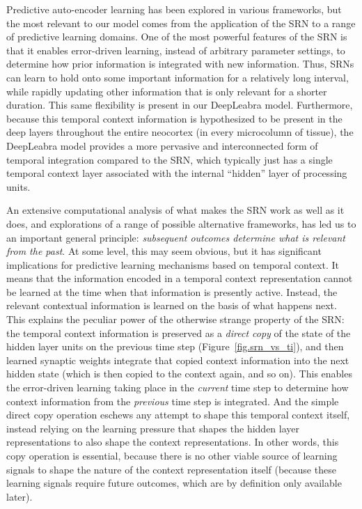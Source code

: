 \documentclass[12pt,twoside]{naturefigs}
\newif\myifpdf
\begin{document}

Predictive auto-encoder learning has been explored in various frameworks, but the most relevant to our model comes from the application of the SRN to a range of predictive learning domains\cite{Elman90,ElmanBatesKarmiloff-SmithEtAl96}.  One of the most powerful features of the SRN is that it enables error-driven learning, instead of arbitrary parameter settings, to determine how prior information is integrated with new information.  Thus, SRNs can learn to hold onto some important information for a relatively long interval, while rapidly updating other information that is only relevant for a shorter duration.  This same flexibility is present in our DeepLeabra model.  Furthermore, because this temporal context information is hypothesized to be present in the deep layers throughout the entire neocortex (in every microcolumn of tissue), the DeepLeabra model provides a more pervasive and interconnected form of temporal integration compared to the SRN, which typically just has a single temporal context layer associated with the internal ``hidden'' layer of processing units.

An extensive computational analysis of what makes the SRN work as well as it does, and explorations of a range of possible alternative frameworks, has led us to an important general principle: {\em subsequent outcomes determine what is relevant from the past}.  At some level, this may seem obvious, but it has significant implications for predictive learning mechanisms based on temporal context.  It means that the information encoded in a temporal context representation cannot be learned at the time when that information is presently active.  Instead, the relevant contextual information is learned on the basis of what happens next.  This explains the peculiar power of the otherwise strange property of the SRN: the temporal context information is preserved as a {\em direct copy} of the state of the hidden layer units on the previous time step (Figure~\ref{fig.srn_vs_ti}), and then learned synaptic weights integrate that copied context information into the next hidden state (which is then copied to the context again, and so on).  This enables the error-driven learning taking place in the {\em current} time step to determine how context information from the {\em previous} time step is integrated.  And the simple direct copy operation eschews any attempt to shape this temporal context itself, instead relying on the learning pressure that shapes the hidden layer representations to also shape the context representations.  In other words, this copy operation is essential, because there is no other viable source of learning signals to shape the nature of the context representation itself (because these learning signals require future outcomes, which are by definition only available later).
\end{document}
